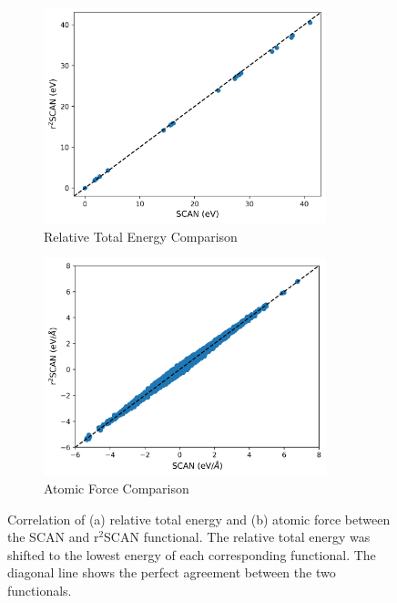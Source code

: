 \begin{figure}[tbhp]
	\centering
	\begin{subfigure}{0.48\textwidth}
		\centering

		\includegraphics[width=0.9\textwidth]{images/scan_vs_r2scan/energy_compare.png}
		\caption{Relative Total Energy Comparison}
		\label{fig:scan_r2scan_E}
	\end{subfigure}
	\hfill
	\begin{subfigure}{0.48\textwidth}
		\centering

		\includegraphics[width=0.9\textwidth]{images/scan_vs_r2scan/force_compare.png}
		\caption{Atomic Force Comparison}
		\label{fig:scan_r2scan_F}
	\end{subfigure}

	\caption{Correlation of  (a) relative total energy and (b) atomic force
		between 		the		SCAN and
		r$^2$SCAN functional. The relative total energy was shifted to
		the lowest energy of each corresponding functional. The
		diagonal line shows the
		perfect
		agreement between
		the two functionals.}
	\label{fig:scan_r2scan}
\end{figure}

